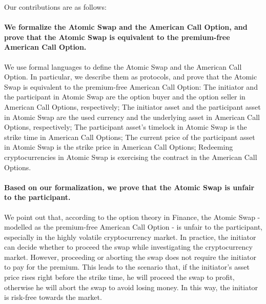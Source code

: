 Our contributions are as follows:

\paragraph{We formalize the Atomic Swap and the American Call Option, and prove that the Atomic Swap is equivalent to the premium-free American Call Option.}
We use formal languages to define the Atomic Swap and the American Call Option.
In particular, we describe them as protocols, and prove that the Atomic Swap is equivalent to the premium-free American Call Option:
The initiator and the participant in Atomic Swap are the option buyer and the option seller in American Call Options, respectively;
The initiator asset and the participant asset in Atomic Swap are the used currency and the underlying asset in American Call Options, respectively;
The participant asset's timelock in Atomic Swap is the strike time in American Call Options;
The current price of the participant asset in Atomic Swap is the strike price in American Call Options;
Redeeming cryptocurrencies in Atomic Swap is exercising the contract in the American Call Options.

\paragraph{Based on our formalization, we prove that the Atomic Swap is unfair to the participant.}
We point out that, according to the option theory in Finance, the Atomic Swap - modelled as the premium-free American Call Option - is unfair to the participant, especially in the highly volatile cryptocurrency market.
In practice, the initiator can decide whether to proceed the swap while investigating the cryptocurrency market.
However, proceeding or aborting the swap does not require the initiator to pay for the premium.
This leads to the scenario that, if the initiator's asset price rises right before the strike time, he will proceed the swap to profit, otherwise he will abort the swap to avoid losing money.
In this way, the initiator is risk-free towards the market.

